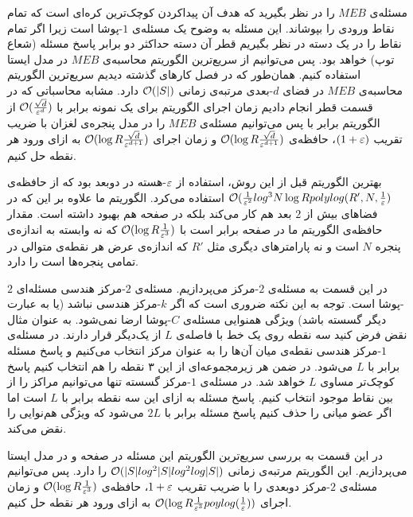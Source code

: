 مسئله‌ی $MEB$ را در نظر بگیرید که هدف آن پیدا‌کردن کوچک‌ترین کره‌ای است که تمام نقاط ورودی را بپوشاند. این مسئله به وضوح یک مسئله‌ی $1$-پوشا است زیرا اگر تمام نقاط را در یک دسته در نظر بگیریم قطر آن دسته حداکثر دو برابر پاسخ مسئله (شعاع توپ) خواهد بود. پس می‌توانیم از سریع‌ترین الگوریتم محاسبه‌ی $MEB$ در مدل ایستا استفاده کنیم. همان‌طور که در فصل کارهای گذشته دیدیم سریع‌ترین الگوریتم محاسبه‌ی $MEB$ در فضای $d$-بعدی  مرتبه‌ی زمانی $\mathcal{O}(|S|)$ دارد. مشابه محاسباتی که در قسمت قطر انجام دادیم زمان اجرای الگوریتم برای یک نمونه  برابر با 
$ \mathcal{O}(\frac{\sqrt{d}}{\varepsilon^d})$
از الگوریتم برابر با پس می‌توانیم مسئله‌ی $MEB$ را در مدل پنجره‌ی لغزان با ضریب تقریب $(1+\varepsilon)$، حافظه‌ی 
$ \mathcal{O}(\log R \frac{\sqrt{d}}{\varepsilon^{d+1}})$
و زمان اجرای
$ \mathcal{O}(\log R \frac{\sqrt{d}}{\varepsilon^{d+1}})$
به ازای ورود هر نقطه حل کنیم.

بهترین الگوریتم قبل از این روش، استفاده از $\varepsilon$-هسته در دوبعد بود  که از حافظه‌ی 
$ \mathcal{O}(\frac{1}{\varepsilon^2} log^3 N \log R polylog(R', N, \frac{1}{\varepsilon})$
استفاده می‌کرد. الگوریتم ما علاوه بر این که در فضاهای بیش از $2$ بعد هم کار می‌کند بلکه در صفحه هم بهبود داشته است. مقدار حافظه‌ی الگوریتم ما در صفحه برابر است با
$ \mathcal{O}(\log R \frac{1}{\varepsilon^3})$
که نه وابسته به اندازه‌ی پنجره $N$ است و نه پارامترهای دیگری مثل $R'$ که اندازه‌ی عرض هر نقطه‌ی متوالی در تمامی پنجره‌ها است را دارد.

در این قسمت به مسئله‌ی $2$-مرکز می‌پردازیم. مسئله‌ی $2$-مرکز  هندسی مسئله‌ای $2$-پوشا است.  توجه به این نکته ضروری است که اگر $k$-مرکز هندسی نباشد (یا به عبارت دیگر گسسته باشد) ویژگی همنوایی مسئله‌ی $C$-پوشا ارضا نمی‌شود. به عنوان مثال نقض فرض کنید سه نقطه روی یک خط با فاصله‌ی $L$ از یک‌دیگر قرار دارند. در مسئله‌ی $1$-مرکز هندسی   نقطه‌ی میان آن‌ها را به عنوان مرکز انتخاب می‌کنیم و پاسخ مسئله برابر با $L$ می‌شود.  در ضمن هر زیر‌مجموعه‌ای از این ۳ نقطه را هم انتخاب کنیم پاسخ کوچک‌تر مساوی $L$ خواهد شد. در مسئله‌ی $1$-مرکز گسسته تنها می‌توانیم مراکز را از بین نقاط موجود انتخاب کنیم. پاسخ مسئله به ازای این سه نقطه برابر با $L$ است اما اگر عضو میانی را حذف کنیم پاسخ مسئله برابر با $2L$ می‌شود که ویژگی هم‌نوایی را نقض می‌کند. 

در این قسمت به بررسی سریع‌ترین الگوریتم این مسئله در صفحه و در مدل ایستا می‌پردازیم. این الگوریتم مرتبه‌ی زمانی 
$ \mathcal{O}(|S| log^2 |S| log ^2 log |S|)$
را دارد. پس می‌توانیم مسئله‌ی $2$-مرکز دوبعدی را با ضریب تقریب $1+\varepsilon$، حافظه‌ی 
$ \mathcal{O}(\log R \frac{1}{\varepsilon^{3}})$
و زمان اجرای
$ \mathcal{O}(\log R \frac{1}{\varepsilon^3} poylog(\frac{1}{\varepsilon}))$
به ازای ورود هر نقطه حل کنیم.

